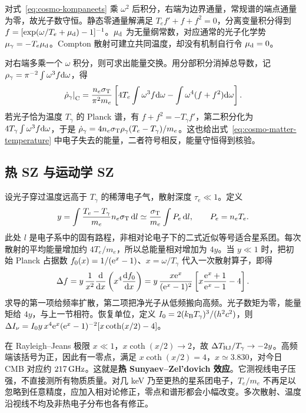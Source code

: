 对式~\eqref{eq:cosmo-kompaneets} 乘 $\omega^2$ 后积分，右端为边界通量，常规谱的端点通量为零，故光子数守恒。静态零通量解满足 $T_e f'+f+f^2=0$，分离变量积分得到 $f=[\exp(\omega/T_e+\mu_{\rm d})-1]^{-1}$。$\mu_{\rm d}$ 为无量纲常数，对应通常的光子化学势 $\mu_\gamma=-T_e\mu_{\rm d}$。Compton 散射可建立共同温度，却没有机制自行令 $\mu_{\rm d}=0$。

对右端多乘一个 $\omega$ 积分，则可求出能量交换。用分部积分消掉总导数，记 $\rho_\gamma=\pi^{-2}\int\omega^3f\dd\omega$，得
\[
 \left.\dot\rho_\gamma\right|_{\rm C}
 =\frac{n_e\sigma_{\rm T}}{\pi^2m_e}
 \left[4T_e\int\omega^3f\dd\omega-\int\omega^4(f+f^2)\dd\omega\right].
\]
若光子恰为温度 $T_\gamma$ 的 Planck 谱，有 $f+f^2=-T_\gamma f'$，第二积分化为 $4T_\gamma\int\omega^3f\dd\omega$，于是 $\dot\rho_\gamma=4n_e\sigma_{\rm T}\rho_\gamma(T_e-T_\gamma)/m_e$。这也给出式~\eqref{eq:cosmo-matter-temperature} 中电子失去的能量，二者符号相反，能量守恒得到核验。

\subsection{热 SZ 与运动学 SZ}

设光子穿过温度远高于 $T_\gamma$ 的稀薄电子气，散射深度 $\tau_e\ll1$。定义
\[
 y=\int\frac{T_e-T_\gamma}{m_e}n_e\sigma_{\rm T}\,\dd l
 \simeq\frac{\sigma_{\rm T}}{m_e}\int P_e\,\dd l,\qquad P_e=n_eT_e .
\]
此处 $l$ 是电子系中的固有路程，非相对论电子下的二式近似等号适合星系团。每次散射的平均能量增加约 $4T_e/m_e$，所以总能量相对增加为 $4y$。当 $y\ll1$ 时，把初始 Planck 占据数 $f_0(x)=1/(\mathrm{e}^x-1)$、$x=\omega/T_\gamma$ 代入一次散射算子，即得
\begin{equation}\label{eq:cosmo-y-distortion}
 \Delta f=y\,\frac{1}{x^2}\frac{\dd}{\dd x}
               \left(x^4\frac{\dd f_0}{\dd x}\right)
 =y\,\frac{x\mathrm{e}^x}{(\mathrm{e}^x-1)^2}
       \left[x\frac{\mathrm{e}^x+1}{\mathrm{e}^x-1}-4\right].
\end{equation}
求导的第一项给频率扩散，第二项把净光子从低频搬向高频。光子数矩为零，能量矩给 $4y$，与上一节相符。恢复单位，定义 $I_0=2(k_{\rm B}T_\gamma)^3/(h^2c^2)$，则 $\Delta I_\nu=I_0y\,x^4\mathrm{e}^x(\mathrm{e}^x-1)^{-2}[x\coth(x/2)-4]$。

在 Rayleigh--Jeans 极限 $x\ll1$，$x\coth(x/2)\to2$，故 $\Delta T_{\rm RJ}/T_\gamma\to-2y$。高频端该括号为正，因此有一零点，满足 $x\coth(x/2)=4$，$x\simeq3.830$，对今日 CMB 对应约 $217\,{\rm GHz}$。这就是\textbf{热 Sunyaev--Zel'dovich 效应}。它测视线电子压强，不直接测所有物质质量。对几 keV 乃至更热的星系团电子，$T_e/m_e$ 不再足以忽略到任意精度，应加入相对论修正，零点和谱形都会小幅改变。多次散射、温度沿视线不均及非热电子分布也各有修正。

